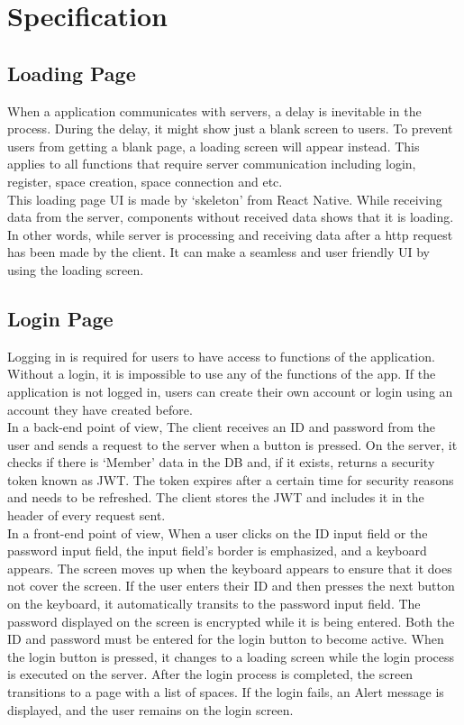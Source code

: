 \documentclass[conference]{IEEEtran}
\begin{document}
\section{Specification}
    \subsection{Loading Page}
        When a application communicates with servers, a delay is inevitable in the process. During the delay, it might show just a blank screen to users. To prevent users from getting a blank page, a loading screen will appear instead. This applies to all functions that require server communication including login, register, space creation, space connection and etc. \\
        This loading page UI is made by ‘skeleton’ from React Native. While receiving data from the server, components without received data shows that it is loading. In other words, while server is processing and receiving data after a http request has been made by the client. It can make a seamless and user friendly UI by using the loading screen.
    \subsection{Login Page}
        Logging in is required for users to have access to functions of the application. Without a login, it is impossible to use any of the functions of the app. If the application is not logged in, users can create their own account or login using an account they have created before. \\
        In a back-end point of view, The client receives an ID and password from the user and sends a request to the server when a button is pressed. On the server, it checks if there is ‘Member’ data in the DB and, if it exists, returns a security token known as JWT. The token expires after a certain time for security reasons and needs to be refreshed.  The client stores the JWT and includes it in the header of every request sent. \\
        In a front-end point of view, When a user clicks on the ID input field or the password input field, the input field's border is emphasized, and a keyboard appears. The screen moves up when the keyboard appears to ensure that it does not cover the screen.  If the user enters their ID and then presses the next button on the keyboard, it automatically transits to the password input field. The password displayed on the screen is encrypted while it is being entered.  Both the ID and password must be entered for the login button to become active. When the login button is pressed, it changes to a loading screen while the login process is executed on the server. After the login process is completed, the screen transitions to a page with a list of spaces. If the login fails, an Alert message is displayed, and the user remains on the login screen.
\end{document}
